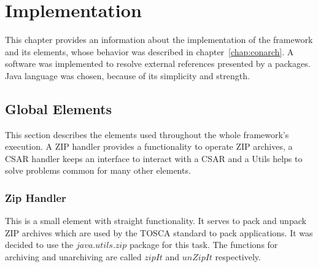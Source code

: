 
\chapter{Implementation}\label{chap:imp}
This chapter provides an information about the implementation of the framework and its elements, whose behavior was described in chapter~\ref{chap:conarch}.
A software was implemented to resolve external references presented by a packages.
Java language was chosen, because of its simplicity and strength. 



\section{Global Elements}
This section describes the elements used throughout the whole framework's execution.
A ZIP handler provides a functionality to operate ZIP archives, a CSAR handler keeps an interface to interact with a CSAR and a Utils helps to solve problems common for many other elements.

\subsection*{Zip Handler}
This is a small element with straight functionality. 
It serves to pack and unpack ZIP archives which are used by the TOSCA standard to pack applications.
It was decided to use the $java$.$utils$.$zip$ package for this task.
The functions for archiving and unarchiving are called $zipIt$ and $unZipIt$ respectively. 

